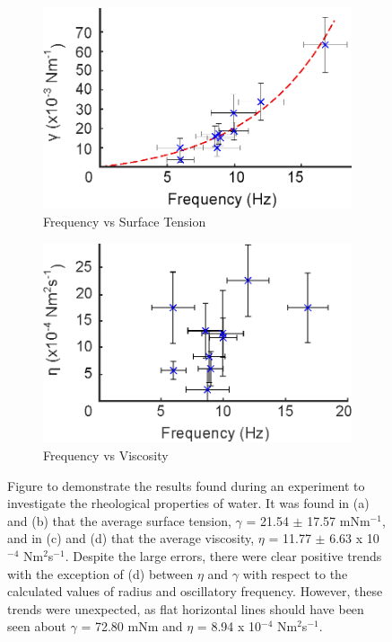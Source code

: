 \documentclass{physics_article_B}
\begin{document}
\begin{figure}[H]
\begin{subfigure}[b]{0.48\textwidth}
                \hspace*{-0.2cm}\includegraphics[width=\textwidth]{Figures/f_vs_gamma.eps}
                \caption{Frequency vs Surface Tension}
                \label{fig:vsgamma:f}
            \end{subfigure}\hspace{3pt}
            \begin{subfigure}[b]{0.48\textwidth}
                \hspace*{0.2cm}\includegraphics[width=\textwidth]{Figures/f_vs_eta.eps} 
                \caption{Frequency vs Viscosity}
                \label{fig:vseta:f}
                \end{subfigure}
            \caption{Figure to demonstrate the results found during an experiment to investigate the rheological properties of water. It was found in (a) and (b) that the average surface tension, $\gamma$ = 21.54 $\pm$ 17.57 mNm$^{-1}$, and in (c) and (d) that the average viscosity, $\eta$ = 11.77 $\pm$ 6.63 x 10$^{-4}$ Nm$^{2}$s$^{-1}$. Despite the large errors, there were clear positive trends with the exception of (d) between $\eta$ and $\gamma$ with respect to the calculated values of radius and oscillatory frequency. However, these trends were unexpected, as flat horizontal lines should have been seen about $\gamma$ = 72.80 mNm and $\eta$ = 8.94 x 10$^{-4}$ Nm$^{2}$s$^{-1}$.}
            \label{fig:finalresults}
        \end{figure} 
        
\end{document}
